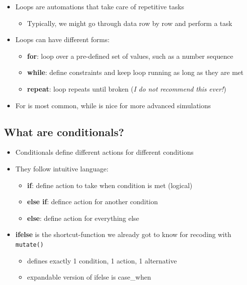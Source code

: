 \documentclass[
]{book}
\providecommand{\tightlist}{%
  \setlength{\itemsep}{0pt}\setlength{\parskip}{0pt}}
\begin{document}
\begin{itemize}
\tightlist
\item
  Loops are automations that take care of repetitive tasks

  \begin{itemize}
  \tightlist
  \item
    Typically, we might go through data row by row and perform a task
  \end{itemize}
\item
  Loops can have different forms:

  \begin{itemize}
  \tightlist
  \item
    \textbf{for}: loop over a pre-defined set of values, such as a number sequence
  \item
    \textbf{while}: define constraints and keep loop running as long as they are met
  \item
    \textbf{repeat}: loop repeats until broken (\emph{I do not recommend this ever!})
  \end{itemize}
\item
  For is most common, while is nice for more advanced simulations
\end{itemize}

\subsection{What are conditionals?}\label{what-are-conditionals}

\begin{itemize}
\tightlist
\item
  Conditionals define different actions for different conditions
\item
  They follow intuitive language:

  \begin{itemize}
  \tightlist
  \item
    \textbf{if}: define action to take when condition is met (logical)
  \item
    \textbf{else if}: defince action for another condition
  \item
    \textbf{else}: define action for everything else
  \end{itemize}
\item
  \textbf{ifelse} is the shortcut-function we already got to know for recoding with \texttt{mutate()}

  \begin{itemize}
  \tightlist
  \item
    defines exactly 1 condition, 1 action, 1 alternative
  \item
    expandable version of ifelse is case\_when
  \end{itemize}
\end{itemize}
\end{document}

